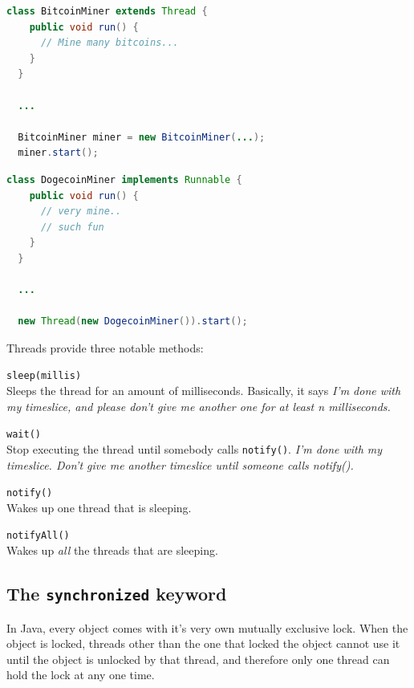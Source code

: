 \begin{lstlisting}[language=Java,caption=Extending the Thread class]
  class BitcoinMiner extends Thread {
    public void run() {
      // Mine many bitcoins...
    }
  }

  ...

  BitcoinMiner miner = new BitcoinMiner(...);
  miner.start();
\end{lstlisting}

\begin{lstlisting}[language=Java,caption=Using the runnable interface,
                   label=lst:doge]
  class DogecoinMiner implements Runnable {
    public void run() {
      // very mine..
      // such fun
    }
  }

  ...

  new Thread(new DogecoinMiner()).start();
\end{lstlisting}

Threads provide three notable methods:

\begin{description}
  \item \texttt{sleep(millis)}\\
    Sleeps the thread for an amount of milliseconds. Basically, it says
    \textit{I'm done with my timeslice, and please don't give me another one for
    at least n milliseconds.}
  \item \texttt{wait()}\\
    Stop executing the thread until somebody calls \texttt{notify()}.
    \textit{I'm done with my timeslice. Don't give me another timeslice until
    someone calls notify().}
  \item \texttt{notify()}\\
    Wakes up one thread that is sleeping.
  \item \texttt{notifyAll()}\\
    Wakes up \textit{all} the threads that are sleeping.
\end{description}

\subsection{The \texttt{synchronized} keyword}

In Java, every object comes with it's very own mutually exclusive lock. When the
object is locked, threads other than the one that locked the object cannot use
it until the object is unlocked by that thread, and therefore only one thread
can hold the lock at any one time.

